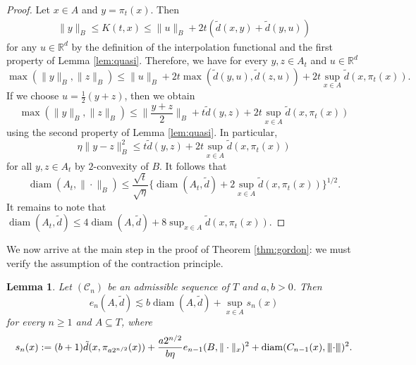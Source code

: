 \documentclass[10pt,reqno]{amsart}
\newtheorem{lem}[thm]{Lemma}
\theoremstyle{definition}
\numberwithin{equation}{section}
\numberwithin{figure}{section}
\numberwithin{table}{section}
\newcommand{\diam}{\mathop{\mathrm{diam}}}
\newcommand{\mynegspace}{\hspace{-0.12em}}
\newcommand{\vvv}{\rvert\mynegspace\rvert\mynegspace\rvert}
\newcommand{\nnn}[1]{{\vvv #1 \vvv}}
\begin{document}
\begin{proof}
Let $x\in A$ and $y=\pi_t(x)$. Then
\begin{align*}
        \|y\|_B \le K(t,x) \le
        \|u\|_B + 2t(\tilde d(x,y) + \tilde d(y,u))
\end{align*}
for any $u\in\mathbb{R}^d$ by the definition of the interpolation 
functional and the first property of Lemma \ref{lem:quasi}.
Therefore, we have for every $y,z\in A_t$ and $u\in\mathbb{R}^d$
$$
        \max(\|y\|_B,\|z\|_B) \le
        \|u\|_B 
	+ 2t \max(\tilde d(y,u),\tilde d(z,u))
	+ 2t \sup_{x\in A}\tilde d(x,\pi_t(x)).
$$
If we choose $u=\tfrac{1}{2}(y+z)$, then we obtain 
$$
        \max(\|y\|_B,\|z\|_B) \le
	\bigg\|\frac{y+z}{2}\bigg\|_B
	+ t\tilde d(y,z)
	+ 2t \sup_{x\in A}\tilde d(x,\pi_t(x))
$$
using the second property of Lemma \ref{lem:quasi}. In particular,
$$
	\eta\|y-z\|_B^2 \le
	t\tilde d(y,z)
	+ 2t \sup_{x\in A}\tilde d(x,\pi_t(x))
$$
for all $y,z\in A_t$ by $2$-convexity of $B$. It follows that
$$
	\diam(A_t,\|\cdot\|_B) \le 
	\frac{\sqrt{t}}{\sqrt{\eta}}
	\bigg\{
	\diam(A_t,\tilde d)
	+ 2\sup_{x\in A}\tilde d(x,\pi_t(x))
	\bigg\}^{1/2}.
$$
It remains to note that
$\diam(A_t,\tilde d)\le 4 \diam(A,\tilde d) + 8\sup_{x\in A}\tilde 
d(x,\pi_t(x))$.
\end{proof}

We now arrive at the main step in the proof of Theorem \ref{thm:gordon}:
we must verify the assumption of the contraction principle.

\begin{lem}
\label{lem:gordoncontr}
Let $(\mathcal{C}_n)$ be an admissible sequence of $T$ and
$a,b>0$. Then 
$$
	e_n(A,\tilde d) \lesssim
	b\diam(A,\tilde d) + \sup_{x\in A} s_n(x)
$$
for every $n\ge 1$ and $A\subseteq T$, where
$$
	s_n(x) :=
	(b+1)\tilde d(x,\pi_{a2^{n/2}}(x)) +
	\frac{a2^{n/2}}{b\eta} e_{n-1}(B,\|\cdot\|_x)^2 +
	\diam(C_{n-1}(x),\nnn{\cdot})^2.
$$
\end{lem}
\end{document}
